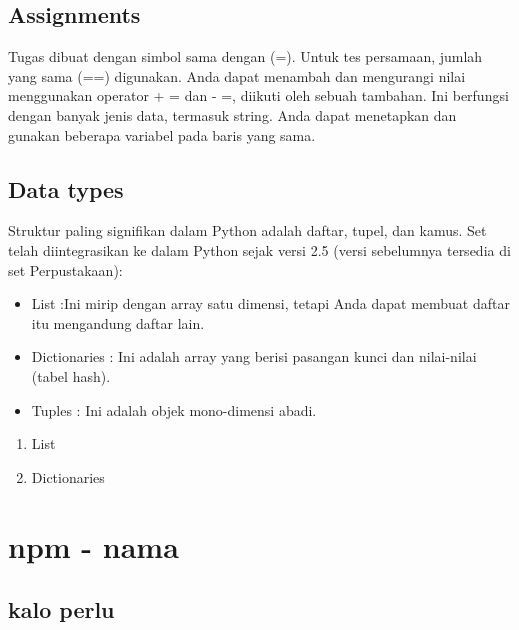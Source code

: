 \subsection{Assignments}
\hfill\break
Tugas dibuat dengan simbol sama dengan (=). Untuk tes persamaan, jumlah yang sama (==)
digunakan. Anda dapat menambah dan mengurangi nilai menggunakan operator + = dan - =, diikuti oleh
sebuah tambahan. Ini berfungsi dengan banyak jenis data, termasuk string. Anda dapat menetapkan dan
gunakan beberapa variabel pada baris yang sama.


\subsection{Data types}
\hfill\break
Struktur paling signifikan dalam Python adalah daftar, tupel, dan kamus. Set telah
diintegrasikan ke dalam Python sejak versi 2.5 (versi sebelumnya tersedia di set
Perpustakaan):
\begin{itemize}
    \item List :Ini mirip dengan array satu dimensi, tetapi Anda dapat membuat daftar itu
mengandung daftar lain.
    \item Dictionaries : Ini adalah array yang berisi pasangan kunci dan nilai-nilai (tabel hash).
    \item Tuples : Ini adalah objek mono-dimensi abadi.
\end{itemize}
\begin{enumerate}
\item List

\item Dictionaries

\end{enumerate}

\section{npm - nama}
\subsection{kalo perlu}